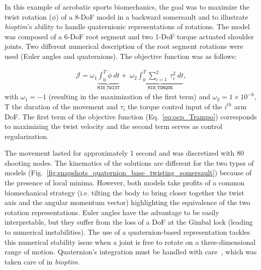 In this example of acrobatic sports biomechanics, the goal was to maximize the twist rotation ($\phi$) of a 8-DoF model in a backward somersault and to illustrate \textit{bioptim}'s ability to handle quaternionic representations of rotations.
The model was composed of a 6-DoF root segment and two 1-DoF torque actuated shoulder joints.
Two different numerical description of the root segment rotations were used (Euler angles and quaternions).
The objective function was as follows:

\begin{eqnarray}\label{eq:ocp_Trampo}
\mathcal{J} = \omega_1 \underbrace{\int_0^T \dot{\phi}~dt}_{\mathtt{MIN\_TWIST}}  +~\omega_2 \underbrace{\int_0^T \sum_{i=1}^{2}~\tau_{i}^2~dt}_{\mathtt{MIN\_ TORQUE}},
\end{eqnarray}
with $\omega_1 = -1$ (resulting in the maximization of the first term) and $\omega_2 = 1\times 10^{-6}$, T the duration of the movement and $\tau_{i}$ the torque control input of the $i^{th}$ arm DoF.
The first term of the objective function (Eq.~\ref{eq:ocp_Trampo}) corresponds to maximizing the twist velocity and the second term serves as control regularization.


The movement lasted for approximately 1 second and was discretized with 80 shooting nodes.
The kinematics of the solutions are different for the two types of models (Fig.~\ref{fig:snapshots_quaternion_base_twisting_somersault}) because of the presence of local minima.
However, both models take profits of a common biomechanical strategy (i.e. tilting the body to bring closer together the twist axis and the angular momentum vector) highlighting the equivalence of the two rotation representations.
Euler angles have the advantage to be easily interpretable, but they suffer from the loss of a DoF at the Gimbal lock (leading to numerical instabilities).
The use of a quaternion-based representation tackles this numerical stability issue when a joint is free to rotate on a three-dimensional range of motion.
Quaternion's integration must be handled with care~\cite{bailly2020optimal}, which was taken care of in \textit{bioptim}.

